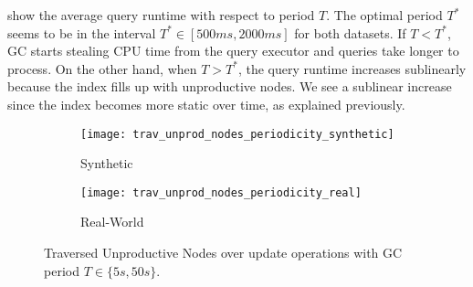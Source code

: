 \documentclass[abstracton,12pt]{scrartcl}
\theoremstyle{definition}
\begin{document}

show the average query runtime with respect to period $T$.
The optimal period $T^*$ seems to be in the interval $T^* \in [500ms,2000ms]$ for
both datasets. If $T < T^*$, GC starts stealing CPU time
from the query executor and queries take longer to process.
On the other hand, when $T > T^*$, the query runtime increases sublinearly because
the index fills up with unproductive nodes. We see a sublinear increase since
the index becomes more static over time, as explained previously.

\begin{figure}[h]
  \centering
  \begin{subfigure}{0.49\linewidth}
    \centering
    \caption{Synthetic}
    \texttt{[image: trav\_unprod\_nodes\_periodicity\_synthetic]}
    \label{fig:trav_unprod_nodes_periodicity_synthetic}
  \end{subfigure}
  \begin{subfigure}{0.49\linewidth}
    \centering
    \caption{Real-World}
    \texttt{[image: trav\_unprod\_nodes\_periodicity\_real]}
    \label{fig:trav_unprod_nodes_periodicity_real}
  \end{subfigure}
  \vspace{-0.5cm}
  \caption{Traversed Unproductive Nodes over update operations with GC period $T \in \{5s, 50s\}$.}
\end{figure}
\end{document}
